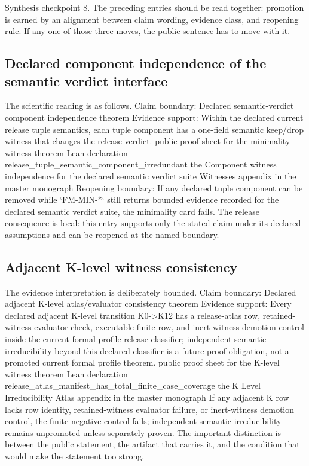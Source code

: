Synthesis checkpoint 8. The preceding entries should be read together: promotion is earned by an alignment between claim wording, evidence class, and reopening rule. If any one of those three moves, the public sentence has to move with it.

\subsection{Declared component independence of the semantic verdict interface}
The scientific reading is as follows. Claim boundary: Declared semantic-verdict component independence theorem Evidence support: Within the declared current release tuple semantics, each tuple component has a one-field semantic keep/drop witness that changes the release verdict. public proof sheet for the minimality witness theorem Lean declaration release\_tuple\_semantic\_component\_irredundant the Component witness independence for the declared semantic verdict suite Witnesses appendix in the master monograph Reopening boundary: If any declared tuple component can be removed while `FM-MIN-*` still returns bounded evidence recorded for the declared semantic verdict suite, the minimality card fails. The release consequence is local: this entry supports only the stated claim under its declared assumptions and can be reopened at the named boundary.

\subsection{Adjacent K-level witness consistency}
The evidence interpretation is deliberately bounded. Claim boundary: Declared adjacent K-level atlas/evaluator consistency theorem Evidence support: Every declared adjacent K-level transition K0-\textgreater{}K12 has a release-atlas row, retained-witness evaluator check, executable finite row, and inert-witness demotion control inside the current formal profile release classifier; independent semantic irreducibility beyond this declared classifier is a future proof obligation, not a promoted current formal profile theorem. public proof sheet for the K-level witness theorem Lean declaration release\_atlas\_manifest\_has\_total\_finite\_case\_coverage the K Level Irreducibility Atlas appendix in the master monograph If any adjacent K row lacks row identity, retained-witness evaluator failure, or inert-witness demotion control, the finite negative control fails; independent semantic irreducibility remains unpromoted unless separately proven. The important distinction is between the public statement, the artifact that carries it, and the condition that would make the statement too strong.
